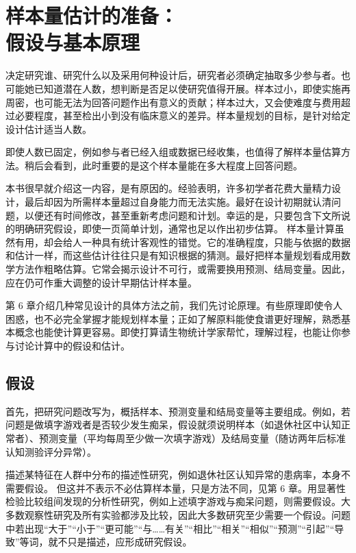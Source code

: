 \chapter[样本量估计的准备：假设与基本原理]{样本量估计的准备：\\假设与基本原理}

决定研究谁、研究什么以及采用何种设计后，研究者必须确定抽取多少参与者。也可能她已知道潜在人数，想判断是否足以使研究值得开展。样本过小，即使实施再周密，也可能无法为回答问题作出有意义的贡献；样本过大，又会使难度与费用超过必要程度，甚至检出小到没有临床意义的差异。样本量规划的目标，是针对给定设计估计适当人数。

即使人数已固定，例如参与者已经入组或数据已经收集，也值得了解样本量估算方法。稍后会看到，此时重要的是这个样本量能在多大程度上回答问题。

本书很早就介绍这一内容，是有原因的。经验表明，许多初学者花费大量精力设计，最后却因为所需样本量超过自身能力而无法实施。最好在设计初期就认清问题，以便还有时间修改，甚至重新考虑问题和计划。幸运的是，只要包含下文所说的明确研究假设，即使一页简单计划，通常也足以作出初步估算。
样本量计算虽然有用，却会给人一种具有统计客观性的错觉。它的准确程度，只能与依据的数据和估计一样，而这些估计往往只是有知识根据的猜测。最好把样本量规划看成用数学方法作粗略估算。它常会揭示设计不可行，或需要换用预测、结局变量。因此，应在仍可作重大调整的设计早期估计样本量。

第 6 章介绍几种常见设计的具体方法之前，我们先讨论原理。有些原理即使令人困惑，也不必完全掌握才能规划样本量；正如了解原料能使食谱更好理解，熟悉基本概念也能使计算更容易。即使打算请生物统计学家帮忙，理解过程，也能让你参与讨论计算中的假设和估计。

\section{假设}
首先，把研究问题改写为，概括样本、预测变量和结局变量等主要组成。例如，若问题是做填字游戏者是否较少发生痴呆，假设就须说明样本（如退休社区中认知正常者）、预测变量（平均每周至少做一次填字游戏）及结局变量（随访两年后标准认知测验评分异常）。

描述某特征在人群中分布的描述性研究，例如退休社区认知异常的患病率，本身不需要假设。
但这并不表示不必估算样本量，只是方法不同，见第 6 章。用显著性检验比较组间发现的分析性研究，例如上述填字游戏与痴呆问题，则需要假设。大多数观察性研究及所有实验都涉及比较，因此大多数研究至少需要一个假设。问题中若出现“大于”“小于”“更可能”“与……有关”“相比”“相关”“相似”“预测”“引起”“导致”等词，就不只是描述，应形成研究假设。

